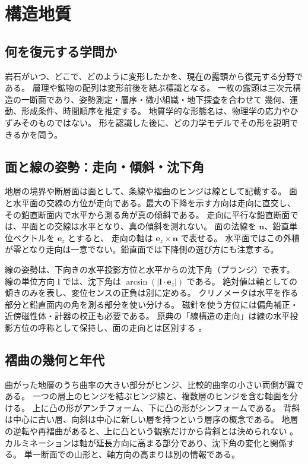 \chapter{構造地質}
\section{何を復元する学問か}
岩石がいつ、どこで、どのように変形したかを、現在の露頭から復元する分野である。
層理や鉱物の配列は変形前後を結ぶ標識となる。
一枚の露頭は三次元構造の一断面であり、姿勢測定・層序・微小組織・地下探査を合わせて
幾何、運動、形成条件、時間順序を推定する。
地質学的な形態名は、物理学の応力やひずみそのものではない。
形を認識した後に、どの力学モデルでその形を説明できるかを問う\cite{str_orientation}。

\section{面と線の姿勢：走向・傾斜・沈下角}
\label{theory:structure:orientation}
地層の境界や断層面は面として、条線や褶曲のヒンジは線として記載する。
面と水平面の交線の方位が走向である。最大の下降を示す方向は走向に直交し、
その鉛直断面内で水平から測る角が真の傾斜である。
走向に平行な鉛直断面では、平面との交線は水平となり、真の傾斜を測れない。
面の法線を \(\boldsymbol n\)、鉛直単位ベクトルを \(\boldsymbol e_z\) とすると、
走向の軸は \(\boldsymbol e_z\times\boldsymbol n\) で表せる。
水平面ではこの外積が零となり走向は一意でない。鉛直面では下降側の選び方にも注意する。

線の姿勢は、下向きの水平投影方位と水平からの沈下角（プランジ）で表す。
線の単位方向 \(\boldsymbol l\) では、沈下角は
\(\arcsin(|\boldsymbol l\cdot\boldsymbol e_z|)\) である。
絶対値は軸としての傾きのみを表し、変位センスの正負は別に定める。
クリノメータは水平を作る部分と鉛直面内の角を測る部分を使い分ける。
磁針を使う方位には偏角補正・近傍磁性体・計器の校正も必要である。
原典の「線構造の走向」は線の水平投影方位の呼称として保持し、面の走向とは区別する
\cite{str_orientation}。

\section{褶曲の幾何と年代}
\label{theory:structure:folds}
曲がった地層のうち曲率の大きい部分がヒンジ、比較的曲率の小さい両側が翼である。
一つの層上のヒンジを結ぶヒンジ線と、複数層のヒンジを含む軸面を分ける。
上に凸の形がアンチフォーム、下に凸の形がシンフォームである。
背斜は中心に古い層、向斜は中心に新しい層を持つという層序の概念である。
地層の逆転や再褶曲があると、上に凸という観察だけから背斜とは決められない
\cite{str_fold_geometry}。
カルミネーションは軸が延長方向に高まる部分であり、沈下角の変化と関係する。
単一断面での山形と、軸方向の高まりは別の情報である\cite{str_culmination}。


